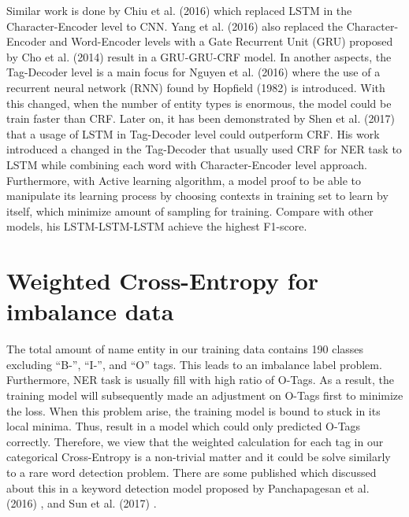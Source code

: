 Similar work is done by Chiu et al. (2016) \cite{DBLP:journals/corr/ChiuN15} which replaced LSTM in the Character-Encoder level to CNN.
Yang et al. (2016) \cite{DBLP:journals/corr/YangSC16} also replaced the Character-Encoder and Word-Encoder levels with a Gate Recurrent Unit (GRU) proposed by Cho et al. (2014) \cite{DBLP:journals/corr/ChoMGBSB14} result in a GRU-GRU-CRF model.
In another aspects, the Tag-Decoder level is a main focus for Nguyen et al. (2016) \cite{DBLP:journals/corr/NguyenSDF16} where the use of a recurrent neural network (RNN) found by Hopfield (1982) \cite{hopfield1982neural} is introduced.
With this changed, when the number of entity types is enormous, the model could be train faster than CRF.
Later on, it has been demonstrated by Shen et al. (2017) \cite{DBLP:journals/corr/ShenYLKA17} that a usage of LSTM in Tag-Decoder level could outperform CRF.
His work introduced a changed in the Tag-Decoder that usually used CRF for NER task to LSTM while combining each word with Character-Encoder level approach.
Furthermore, with Active learning algorithm, a model proof to be able to manipulate its learning process by choosing contexts in training set to learn by itself, which minimize amount of sampling for training.
Compare with other models, his LSTM-LSTM-LSTM achieve the highest F1-score.


\section{Weighted Cross-Entropy for imbalance data}

The total amount of name entity in our training data contains 190 classes excluding ``B-'', ``I-'', and ``O'' tags.
This leads to an imbalance label problem. Furthermore, NER task is usually fill with high ratio of O-Tags.
As a result, the training model will subsequently made an adjustment on O-Tags first to minimize the loss.
When this problem arise, the training model is bound to stuck in its local minima.
Thus, result in a model which could only predicted O-Tags correctly.
Therefore, we view that the weighted calculation for each tag in our categorical Cross-Entropy is a non-trivial matter and it could be solve similarly to a rare word detection problem.
There are some published which discussed about this in a keyword detection model proposed by Panchapagesan et al. (2016) \cite{DBLP:conf/interspeech/PanchapagesanSK16}, and Sun et al. (2017) \cite{DBLP:journals/corr/SunRTPFMMSV17}.

